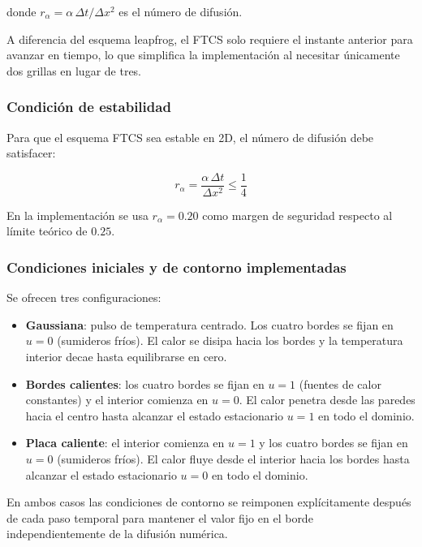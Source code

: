 \documentclass[12pt, a4paper]{article}
\begin{document}
donde $r_\alpha = \alpha\,\Delta t / \Delta x^2$ es el número de difusión.

A diferencia del esquema leapfrog, el FTCS solo requiere el instante anterior para
avanzar en tiempo, lo que simplifica la implementación al necesitar únicamente dos
grillas en lugar de tres.

\subsubsection{Condición de estabilidad}

Para que el esquema FTCS sea estable en 2D, el número de difusión debe satisfacer:

\begin{equation}
    r_\alpha = \frac{\alpha\,\Delta t}{\Delta x^2} \leq \frac{1}{4}
    \label{eq:estab-calor}
\end{equation}

En la implementación se usa $r_\alpha = 0.20$ como margen de seguridad respecto al
límite teórico de $0.25$.

\subsubsection{Condiciones iniciales y de contorno implementadas}

Se ofrecen tres configuraciones:

\begin{itemize}
    \item \textbf{Gaussiana}: pulso de temperatura centrado. Los cuatro bordes se fijan
    en $u = 0$ (sumideros fríos). El calor se disipa hacia los bordes y la temperatura
    interior decae hasta equilibrarse en cero.

    \item \textbf{Bordes calientes}: los cuatro bordes se fijan en $u = 1$ (fuentes de
    calor constantes) y el interior comienza en $u = 0$. El calor penetra desde las
    paredes hacia el centro hasta alcanzar el estado estacionario $u = 1$ en todo el
    dominio.

    \item \textbf{Placa caliente}: el interior comienza en $u = 1$ y los cuatro bordes
    se fijan en $u = 0$ (sumideros fríos). El calor fluye desde el interior hacia los
    bordes hasta alcanzar el estado estacionario $u = 0$ en todo el dominio.
\end{itemize}

En ambos casos las condiciones de contorno se reimponen explícitamente después de cada
paso temporal para mantener el valor fijo en el borde independientemente de la difusión
numérica.
\end{document}
